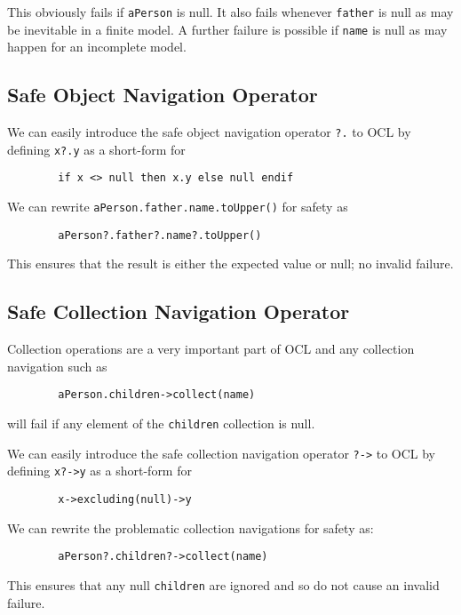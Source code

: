 \documentclass{llncs}
\begin{document}
This obviously fails if \verb|aPerson| is null. It also fails whenever \verb|father| is null as may be inevitable in a finite model. A further failure is possible if \verb|name| is null as may happen for an incomplete model.

\subsection{Safe Object Navigation Operator}

We can easily introduce the safe object  navigation operator \verb|?.|  to OCL by defining \verb|x?.y| as a short-form for 

\begin{verbatim}
        if x <> null then x.y else null endif
\end{verbatim}

We can rewrite \verb|aPerson.father.name.toUpper()| for safety as

\begin{verbatim}
        aPerson?.father?.name?.toUpper()
\end{verbatim}

This ensures that the result is either the expected value or null; no invalid failure.

\subsection{Safe Collection Navigation Operator}

Collection operations are a very important part of OCL and any collection navigation such as 
\begin{verbatim}
        aPerson.children->collect(name)
\end{verbatim}
will fail if any element of the \verb|children| collection is null.

We can easily introduce the safe collection navigation operator \verb|?->|  to OCL by defining \verb|x?->y| as a short-form for 

\begin{verbatim}
        x->excluding(null)->y
\end{verbatim}

We can rewrite the problematic collection navigations for safety as:

\begin{verbatim}
        aPerson?.children?->collect(name)
\end{verbatim}

This ensures that any null \verb|children| are ignored and so do not cause an invalid failure.
\end{document}
